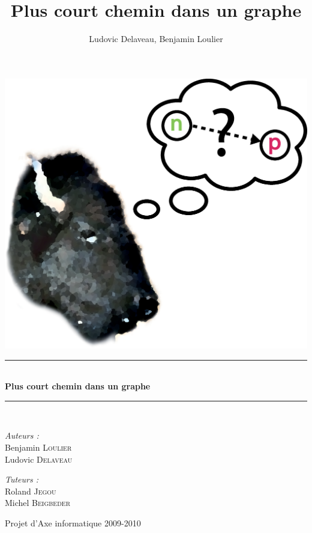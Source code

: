 \documentclass[a4paper,12pt,final] {article}
\author{Ludovic Delaveau, Benjamin Loulier}
\title{Plus court chemin dans un graphe}
\begin{document}
\begin{titlepage}

\vspace*{\fill} %
    \hspace*{\fill}

\begin{center}

\centering
\includegraphics[scale=0.3]{icone}\\[2cm] %

\rule{15cm}{0.2mm} \\[0.4cm]
{ \huge \bfseries Plus court chemin dans un graphe}\\[0.4cm]
 \rule{15cm}{0.2mm} \\[0.4cm]

\begin{minipage}{0.4\textwidth}
\begin{flushleft} \large
\emph{Auteurs :}\\
Benjamin \textsc{Loulier}\\
Ludovic \textsc{Delaveau}\\
\end{flushleft}
\end{minipage}
\begin{minipage}{0.4\textwidth}
\begin{flushright} \large
\emph{Tuteurs :} \\
Roland \textsc{Jegou}\\
Michel \textsc{Beigbeder}\\
\end{flushright}
\end{minipage}
 
\vfill
Projet d'Axe informatique 2009-2010
\end{center}

\end{titlepage}
\end{document}
